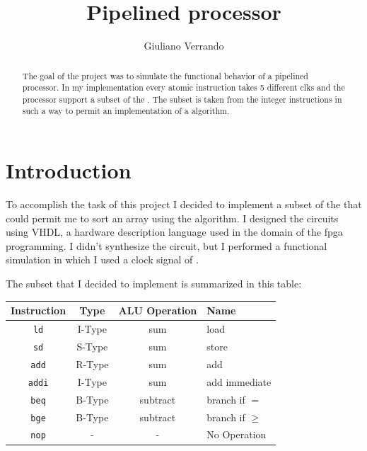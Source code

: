 \documentclass{article}
\title{Pipelined \RISCV processor}
\author{Giuliano Verrando}
\begin{document}
 
\maketitle

\begin{abstract}
The goal of the project was to simulate the functional behavior of a \RISCV pipelined processor.
In my implementation every atomic instruction takes 5 different \glspl{clk} and the processor support a subset of the \RISCV \ISA.
The subset is taken from the integer instructions in such a way to permit an implementation of a \sort algorithm.
\end{abstract}
\clearpage
\tableofcontents
\clearpage

\printglossary[type=\acronymtype]
\clearpage

\section{Introduction}
To accomplish the task of this project I decided to implement a subset of the \RISCV \ISA that could permit me to sort an array
using the \sort algorithm. I designed the circuits using VHDL, a hardware description language used in the domain of the \acrshort{fpga}
programming. I didn't synthesize the circuit, but I performed a functional simulation in which I used a clock signal of .

The subset that I decided to implement is summarized in this table:
\begin{center}
\begin{tabular}{|c |c c ||l|} 
 \hline
 Instruction & Type & ALU Operation & Name \\ 
 \hline\hline
 \texttt{ld} & I-Type & sum &  load \\ 
 \hline
 \texttt{sd} & S-Type & sum &  store \\
 \hline
 \texttt{add} & R-Type & sum &  add \\
 \hline
 \texttt{addi} & I-Type & sum &  add immediate \\
 \hline
  \texttt{beq} & B-Type & subtract & branch if $=$ \\
 \hline
  \texttt{bge} & B-Type & subtract & branch if $\geq$ \\
 \hline
 \texttt{nop} & - & - & No Operation \\
 \hline
\end{tabular}
\end{center}
\end{document}
